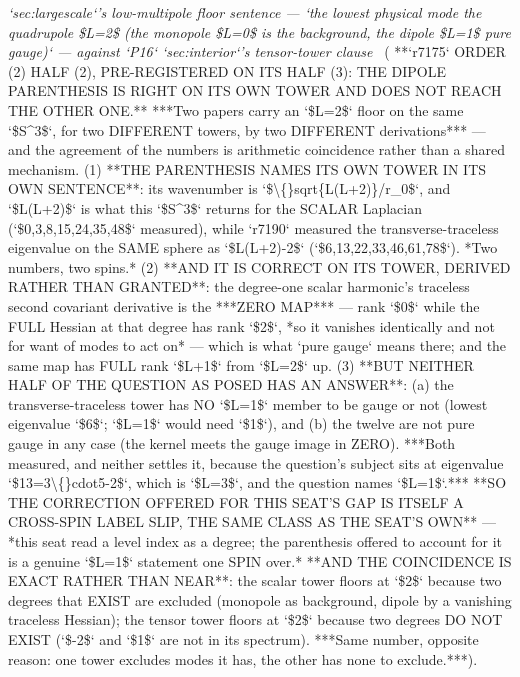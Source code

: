 \begin{description}
\textit{`sec:largescale`'s low-multipole floor sentence --- `the lowest physical mode the quadrupole \$L=2\$ (the monopole \$L=0\$ is the background, the dipole \$L=1\$ pure gauge)` --- against `P16` `sec:interior`'s tensor-tower clause} \ ( **`r7175` ORDER (2) HALF (2), PRE-REGISTERED ON ITS HALF (3): THE DIPOLE PARENTHESIS IS RIGHT ON ITS OWN TOWER AND DOES NOT REACH THE OTHER ONE.** ***Two papers carry an `\$L=2\$` floor on the same `\$S\textasciicircum{}3\$`, for two DIFFERENT towers, by two DIFFERENT derivations*** --- and the agreement of the numbers is arithmetic coincidence rather than a shared mechanism. (1) **THE PARENTHESIS NAMES ITS OWN TOWER IN ITS OWN SENTENCE**: its wavenumber is `\$\textbackslash\{\}sqrt\{L(L+2)\}/r\_0\$`, and `\$L(L+2)\$` is what this `\$S\textasciicircum{}3\$` returns for the SCALAR Laplacian (`\$0,3,8,15,24,35,48\$` measured), while `r7190` measured the transverse-traceless eigenvalue on the SAME sphere as `\$L(L+2)-2\$` (`\$6,13,22,33,46,61,78\$`). *Two numbers, two spins.* (2) **AND IT IS CORRECT ON ITS TOWER, DERIVED RATHER THAN GRANTED**: the degree-one scalar harmonic's traceless second covariant derivative is the ***ZERO MAP*** --- rank `\$0\$` while the FULL Hessian at that degree has rank `\$2\$`, *so it vanishes identically and not for want of modes to act on* --- which is what `pure gauge` means there; and the same map has FULL rank `\$L+1\$` from `\$L=2\$` up.  (3) **BUT NEITHER HALF OF THE QUESTION AS POSED HAS AN ANSWER**: (a) the transverse-traceless tower has NO `\$L=1\$` member to be gauge or not (lowest eigenvalue `\$6\$`; `\$L=1\$` would need `\$1\$`), and (b) the twelve are not pure gauge in any case (the kernel meets the gauge image in ZERO). ***Both measured, and neither settles it, because the question's subject sits at eigenvalue `\$13=3\textbackslash\{\}cdot5-2\$`, which is `\$L=3\$`, and the question names `\$L=1\$`.***  **SO THE CORRECTION OFFERED FOR THIS SEAT'S GAP IS ITSELF A CROSS-SPIN LABEL SLIP, THE SAME CLASS AS THE SEAT'S OWN** --- *this seat read a level index as a degree; the parenthesis offered to account for it is a genuine `\$L=1\$` statement one SPIN over.*  **AND THE COINCIDENCE IS EXACT RATHER THAN NEAR**: the scalar tower floors at `\$2\$` because two degrees that EXIST are excluded (monopole as background, dipole by a vanishing traceless Hessian); the tensor tower floors at `\$2\$` because two degrees DO NOT EXIST (`\$-2\$` and `\$1\$` are not in its spectrum). ***Same number, opposite reason: one tower excludes modes it has, the other has none to exclude.***). 

\end{description}

